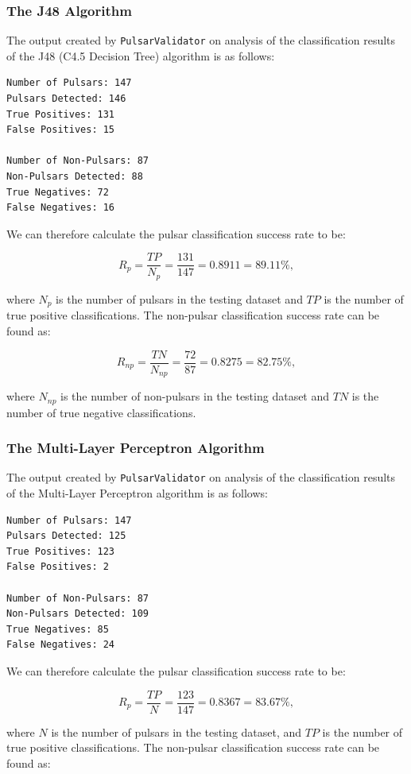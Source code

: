 \documentclass{article}
\begin{document}
\subsubsection{The J48 Algorithm}

The output created by \verb|PulsarValidator| on analysis of the classification results of the J48 (C4.5 Decision Tree) algorithm is as follows:

\begin{lstlisting}[numbers=none]
Number of Pulsars: 147
Pulsars Detected: 146
True Positives: 131
False Positives: 15

Number of Non-Pulsars: 87
Non-Pulsars Detected: 88
True Negatives: 72
False Negatives: 16
\end{lstlisting}

We can therefore calculate the pulsar classification success rate to be:

$$ R_{p} = \frac{TP}{N_p} = \frac{131}{147} =  0.8911 = 89.11\%,$$

where $N_p$ is the number of pulsars in the testing dataset and $TP$ is the number of true positive classifications. The non-pulsar classification success rate can be found as:

$$R_{np} = \frac{TN}{N_{np}} = \frac{72}{87} = 0.8275 = 82.75\%,$$

where $N_{np}$ is the number of non-pulsars in the testing dataset and $TN$ is the number of true negative classifications.

\subsubsection{The Multi-Layer Perceptron Algorithm}

The output created by \verb|PulsarValidator| on analysis of the classification results of the Multi-Layer Perceptron algorithm is as follows:

\begin{lstlisting}[numbers=none]
Number of Pulsars: 147
Pulsars Detected: 125
True Positives: 123
False Positives: 2

Number of Non-Pulsars: 87
Non-Pulsars Detected: 109
True Negatives: 85
False Negatives: 24
\end{lstlisting}

We can therefore calculate the pulsar classification success rate to be:

$$ R_{p} = \frac{TP}{N} = \frac{123}{147} =  0.8367 = 83.67\%,$$

where $N$ is the number of pulsars in the testing dataset, and $TP$ is the number of true positive classifications. The non-pulsar classification success rate can be found as:
\end{document}

